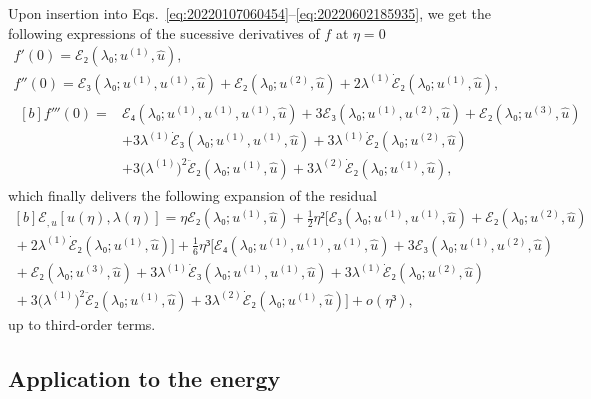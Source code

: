 \documentclass[12pt, final]{scrartcl}
\theoremstyle{definition}
\newcommand{\E}{\mathcal E}
\newcommand{\order}[2][1]{#2^{(#1)}}
\begin{document}
Upon insertion into Eqs.~\eqref{eq:20220107060454}--\eqref{eq:20220602185935},
we get the following expressions of the sucessive derivatives of $f$ at
$η=0$
\begin{gather*}
  f'(0) = \E₂(\lambda₀; \order[1]u, \hat{u}),\\
  f''(0) = \E₃(\lambda₀; \order[1]u, \order[1]u, \hat{u}) + \E₂(\lambda₀; \order[2]u, \hat{u}) + 2 \order[1]\lambda \dot{\E}₂(\lambda₀; \order[1]u, \hat{u}),\\
  \begin{aligned}[b]
    f'''(0) ={}
    & \E₄(\lambda₀; \order[1]u, \order[1]u, \order[1]u, \hat{u}) + 3\E₃(\lambda₀; \order[1]u, \order[2]u, \hat{u}) + \E₂(\lambda₀ ; \order[3]u, \hat{u})\\
    & + 3\order[1]\lambda \dot{\E}₃(\lambda₀; \order[1]u, \order[1]u, \hat{u}) + 3\order[1]\lambda \dot{\E}₂(\lambda₀; \order[2]u, \hat{u})\\
    & + 3 \bigl( \order[1]\lambda \bigr)^2 \ddot{\E}₂(\lambda₀; \order[1]u, \hat{u}) + 3 \order[2]\lambda \dot{\E}₂(\lambda₀; \order[1]u, \hat{u}),
  \end{aligned}
\end{gather*}
which finally delivers the following expansion of the residual
\begin{equation}
  \label{eq:20220107080901}
  \begin{gathered}[b]
    \E_{, u}[u(η), \lambda(η)] ={} η \E₂(\lambda₀; \order[1]u, \hat{u}) + \tfrac{1}{2} η² \bigl[\E₃(\lambda₀; \order[1]u, \order[1]u, \hat{u})  + \E₂(\lambda₀; \order[2]u, \hat{u})\\
    {} + 2 \order[1]\lambda \dot{\E}₂(\lambda₀; \order[1]u, \hat{u})\bigr] + \tfrac{1}{6} η³ \bigl[ \E₄(\lambda₀; \order[1]u, \order[1]u, \order[1]u, \hat{u}) + 3\E₃(\lambda₀; \order[1]u, \order[2]u, \hat{u})\\
    {} + \E₂(\lambda₀; \order[3]u, \hat{u}) + 3\order[1]\lambda \dot{\E}₃(\lambda₀; \order[1]u, \order[1]u, \hat{u}) + 3\order[1]\lambda \dot{\E}₂(\lambda₀; \order[2]u, \hat{u})\\
    {} + 3 \bigl( \order[1]\lambda \bigr)^2 \ddot{\E}₂(\lambda₀; \order[1]u, \hat{u}) + 3 \order[2]\lambda \dot{\E}₂(\lambda₀ ; \order[1]u, \hat{u}) \bigr] + o(η³),
  \end{gathered}
\end{equation}
up to third-order terms.

\subsection{Application to the energy}
\label{sec:20220525053434}
%
\end{document}
